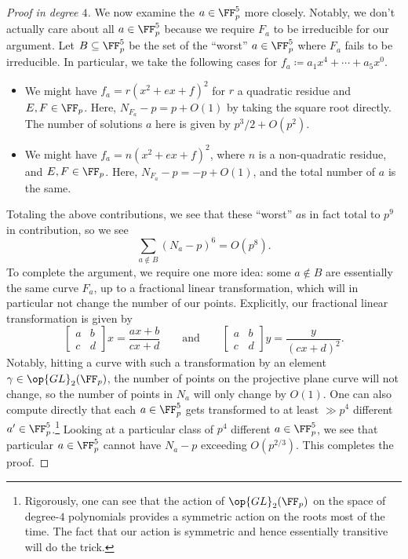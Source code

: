 \documentclass[../notes.tex]{subfiles}
\begin{document}
\begin{proof}[Proof in degree $4$]
	We now examine the $a\in\FF_p^5$ more closely. Notably, we don't actually care about all $a\in\FF_p^5$ because we require $F_a$ to be irreducible for our argument. Let $B\subseteq\FF_p^5$ be the set of the ``worst'' $a\in\FF_p^5$ where $F_a$ fails to be irreducible. In particular, we take the following cases for $f_a\coloneqq a_1x^4+\cdots+a_5x^0$.
	\begin{itemize}
		\item We might have $f_a=r\left(x^2+ex+f\right)^2$ for $r$ a quadratic residue and $E,F\in\FF_p$. Here, $N_{F_a}-p=p+O(1)$ by taking the square root directly. The number of solutions $a$ here is given by $p^3/2+O\left(p^2\right)$.
		\item We might have $f_a=n\left(x^2+ex+f\right)^2$, where $n$ is a non-quadratic residue, and $E,F\in\FF_p$. Here, $N_{F_a}-p=-p+O(1)$, and the total number of $a$ is the same.
	\end{itemize}
	Totaling the above contributions, we see that these ``worst'' $a$s in fact total to $p^9$ in contribution, so we see
	\[\sum_{a\notin B}(N_a-p)^6=O\left(p^8\right).\]
	To complete the argument, we require one more idea: some $a\notin B$ are essentially the same curve $F_a$, up to a fractional linear transformation, which will in particular not change the number of our points. Explicitly, our fractional linear transformation is given by
	\[\begin{bmatrix}
		a & b \\
		c & d
	\end{bmatrix}x=\frac{ax+b}{cx+d}\qquad\text{and}\qquad\begin{bmatrix}
		a & b \\
		c & d
	\end{bmatrix}y=\frac y{(cx+d)^2}.\]
	Notably, hitting a curve with such a transformation by an element $\gamma\in\op{GL}_2(\FF_p)$, the number of points on the projective plane curve will not change, so the number of points in $N_a$ will only change by $O(1)$. One can also compute directly that each $a\in\FF_p^5$ gets transformed to at least $\gg p^4$ different $a'\in\FF_p^5$.\footnote{Rigorously, one can see that the action of $\op{GL}_2(\FF_p)$ on the space of degree-$4$ polynomials provides a symmetric action on the roots most of the time. The fact that our action is symmetric and hence essentially transitive will do the trick.} Looking at a particular class of $p^4$ different $a\in\FF_p^5$, we see that particular $a\in\FF_p^5$ cannot have $N_a-p$ exceeding $O\left(p^{2/3}\right)$. This completes the proof.
\end{proof}
\end{document}
